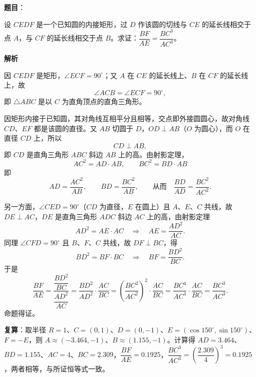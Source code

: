 \begin{answer}

\textbf{题目}：

设 $CEDF$ 是一个已知圆的内接矩形，过 $D$ 作该圆的切线与 $CE$ 的延长线相交于点 $A$，与 $CF$ 的延长线相交于点 $B$。求证：$\dfrac{BF}{AE}=\dfrac{BC^3}{AC^3}$。
\nopagebreak[4]
\begin{center}\end{center}
\nopagebreak[4]
\textbf{解析}
\nopagebreak[4]
\begin{center}\end{center}
\nopagebreak[4]
因 $CEDF$ 是矩形，$\angle ECF=90^\circ$；又 $A$ 在 $CE$ 的延长线上、$B$ 在 $CF$ 的延长线上，故
\nopagebreak[4]
\[
\angle ACB=\angle ECF=90^\circ ,
\]
即 $\triangle ABC$ 是以 $C$ 为直角顶点的直角三角形。

因矩形内接于已知圆，其对角线互相平分且相等，交点即外接圆圆心，故对角线 $CD$、$EF$ 都是该圆的直径。又 $AB$ 切圆于 $D$，$OD\perp AB$（$O$ 为圆心），而 $O$ 在直径 $CD$ 上，所以
\nopagebreak[4]
\[
CD\perp AB ,
\]
即 $CD$ 是直角三角形 $ABC$ 斜边 $AB$ 上的高。由射影定理，
\nopagebreak[4]
\[
AC^2=AD\cdot AB,\qquad BC^2=BD\cdot AB
\]
即
\nopagebreak[4]
\[
AD=\frac{AC^2}{AB},\qquad BD=\frac{BC^2}{AB},\qquad\text{从而}\quad \frac{BD}{AD}=\frac{BC^2}{AC^2}.
\]

另一方面，$\angle CED=90^\circ$（$CD$ 为直径，$E$ 在圆上）且 $A$、$E$、$C$ 共线，故 $DE\perp AC$，$DE$ 是直角三角形 $ADC$ 斜边 $AC$ 上的高，由射影定理
\nopagebreak[4]
\[
AD^2=AE\cdot AC\quad\Longrightarrow\quad AE=\frac{AD^2}{AC}.
\]
同理 $\angle CFD=90^\circ$ 且 $B$、$F$、$C$ 共线，故 $DF\perp BC$，得
\nopagebreak[4]
\[
BD^2=BF\cdot BC\quad\Longrightarrow\quad BF=\frac{BD^2}{BC}.
\]
于是
\nopagebreak[4]
\[
\frac{BF}{AE}=\frac{\dfrac{BD^2}{BC}}{\dfrac{AD^2}{AC}}
=\frac{BD^2}{AD^2}\cdot\frac{AC}{BC}
=\left(\frac{BC^2}{AC^2}\right)^2\cdot\frac{AC}{BC}
=\frac{BC^4}{AC^4}\cdot\frac{AC}{BC}
=\frac{BC^3}{AC^3}.
\]
命题得证。

\textbf{复算}：取半径 $R=1$、$C=(0,1)$、$D=(0,-1)$、$E=(\cos150^\circ,\sin150^\circ)$、$F=-E$，则 $A\approx(-3.464,-1)$、$B\approx(1.155,-1)$。计算得 $AD=3.464$、$BD=1.155$、$AC=4$、$BC=2.309$，$\dfrac{BF}{AE}=0.1925$，$\dfrac{BC^3}{AC^3}=\left(\dfrac{2.309}{4}\right)^3=0.1925$，两者相等，与所证恒等式一致。


\end{answer}
